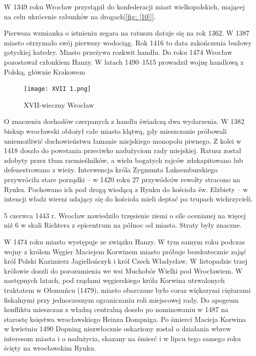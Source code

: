\documentclass{article}
\begin{document}
W 1349 roku Wrocław przystąpił do konfederacji miast wielkopolskich, mającej na celu ukrócenie rabunków na drogach[\ref{fig: [10]}].

Pierwsza wzmianka o istnieniu zegara na ratuszu datuje się na rok 1362. W 1387 miasto otrzymało swój pierwszy wodociąg. Rok 1416 to data zakończenia budowy gotyckiej katedry. Miasto przeżywa rozkwit handlu. Do roku 1474 Wrocław pozostawał członkiem Hanzy. W latach 1490–1515 prowadził wojnę handlową z Polską, głównie Krakowem

\begin{center}
\begin{figure}[h]
	\centering
	\texttt{[image: XVII 1.png]}
	\caption{XVII-wieczny Wrocław}
\end{figure}
\end{center}

O znaczeniu dochodów czerpanych z handlu świadczą dwa wydarzenia. W 1382 biskup wrocławski obłożył całe miasto klątwą, gdy mieszczanie próbowali uniemożliwić duchowieństwu łamanie miejskiego monopolu piwnego. Z kolei w 1418 doszło do powstania przeciwko nadużyciom rady miejskiej. Ratusz został zdobyty przez tłum rzemieślników, a wielu bogatych rajców zdekapitowano lub defenestrowano z wieży. Interwencja króla Zygmunta Luksemburskiego przywróciła stare porządki – w 1420 roku 27 przywódców rewolty stracono na Rynku. Pochowano ich pod drogą wiodącą z Rynku do kościoła św. Elżbiety – w intencji władz wierni udający się do kościoła mieli deptać po trupach wichrzycieli.

5 czerwca 1443 r. Wrocław nawiedziło trzęsienie ziemi o sile ocenianej na więcej niż 6 w skali Richtera z epicentrum na północ od miasta. Straty były znaczne.

W 1474 roku miasto występuje ze związku Hanzy. W tym samym roku podczas wojny z królem Węgier Maciejem Korwinem miasto próbuje bezskutecznie zająć król Polski Kazimierz Jagiellończyk i król Czech Władysław. W listopadzie trzej królowie doszli do porozumienia we wsi Muchobór Wielki pod Wrocławiem. W następnych latach, pod rządami węgierskiego króla Korwina utrwalonych traktatem w Ołomuńcu (1479), miasto obarczane było coraz większymi ciężarami fiskalnymi przy jednoczesnym ograniczaniu roli miejscowej rady. Do apogeum konfliktu mieszczan z władzą centralną doszło po nominowaniu w 1487 na starostę księstwa wrocławskiego Heinza Dompniga. Po śmierci Macieja Korwina w kwietniu 1490 Dopning niezwłocznie oskarżony został o działania wbrew interesom miasta i o nadużycia, skazany na śmierć i w lipcu tego samego roku ścięty na wrocławskim Rynku.
\end{document}
